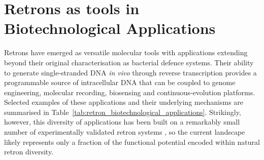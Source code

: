 



\section{Retrons as tools in Biotechnological Applications}

Retrons have emerged as versatile molecular tools with applications extending
beyond their original characterisation as bacterial defence systems. Their
ability to generate single-stranded DNA \textit{in vivo} through reverse
transcription provides a programmable source of intracellular DNA that can be
coupled to genome engineering, molecular recording, biosensing and
continuous-evolution platforms. Selected examples of these applications and
their underlying mechanisms are summarised in
Table~\ref{tab:retron_biotechnological_applications}. Strikingly, however, this
diversity of applications has been built on a remarkably small number of
experimentally validated retron systems \cite{simon2019}, so the
current landscape likely represents only a fraction of the functional potential
encoded within natural retron diversity.

